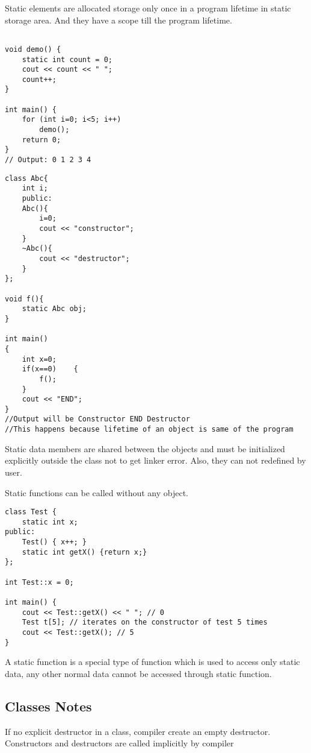 \documentclass{article}
\begin{document}
Static elements are allocated storage only once in a program lifetime in static storage area. And they have a scope till the program lifetime.

\begin{lstlisting}

void demo() {  
    static int count = 0; 
    cout << count << " "; 
    count++; 
} 
  
int main() { 
    for (int i=0; i<5; i++)     
        demo(); 
    return 0; 
} 
// Output: 0 1 2 3 4 
\end{lstlisting}

\begin{lstlisting}
class Abc{
    int i;
    public:
	Abc(){
        i=0;
        cout << "constructor";
    }
	~Abc(){
        cout << "destructor";
    }
};

void f(){
    static Abc obj;
}

int main()
{
    int x=0;
    if(x==0)    {
        f();
    }
    cout << "END";
}
//Output will be Constructor END Destructor 
//This happens because lifetime of an object is same of the program
\end{lstlisting}

Static data members are shared between the objects and must be initialized explicitly outside the class not to get linker error. Also, they can not redefined by user. 


Static functions can be called without any object.

\begin{lstlisting}
class Test {
    static int x;
public:
    Test() { x++; }
    static int getX() {return x;}
};
 
int Test::x = 0;
 
int main() {
    cout << Test::getX() << " "; // 0
    Test t[5]; // iterates on the constructor of test 5 times
    cout << Test::getX(); // 5
}
\end{lstlisting}

 A static function is a special type of function which is used to access only static data, any other normal data cannot be accessed through static function.

\newpage

\subsection{Classes Notes}

If no explicit destructor in a class, compiler create an empty destructor.
Constructors and destructors are called implicitly by compiler
\end{document}
